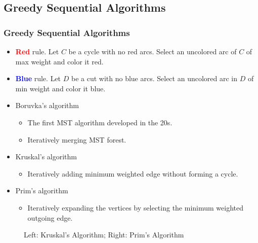 \subsection{Greedy Sequential Algorithms}

\begin{frame}
\frametitle{Greedy Sequential Algorithms}

\begin{itemize}
\item \textcolor{red}{\textbf{Red}} rule. Let $C$ be a cycle with no red arcs. Select an uncolored arc of $C$ of max weight and color it red. 
\item \textcolor{blue}{\textbf{Blue}} rule. Let $D$ be a cut with no blue arcs. Select an uncolored arc in $D$ of min weight and color it blue.
\end{itemize}
\begin{itemize}
  \item Boruvka's algorithm
    \begin{itemize}
      \item The first MST algorithm developed in the 20s.
      \item Iteratively merging MST forest.
    \end{itemize}
  \item Kruskal's algorithm
    \begin{itemize} 
      \item Iteratively adding minimum weighted edge without forming a cycle.
    \end{itemize}
  \item Prim's algorithm
    \begin{itemize} 
      \item Iteratively expanding the vertices by selecting the minimum weighted outgoing edge.
    \end{itemize}
\end{itemize}
\end{frame}

\begin{frame}
\begin{figure}
\caption{Left: Kruskal's Algorithm; Right: Prim's Algorithm}
\end{figure}
\end{frame}